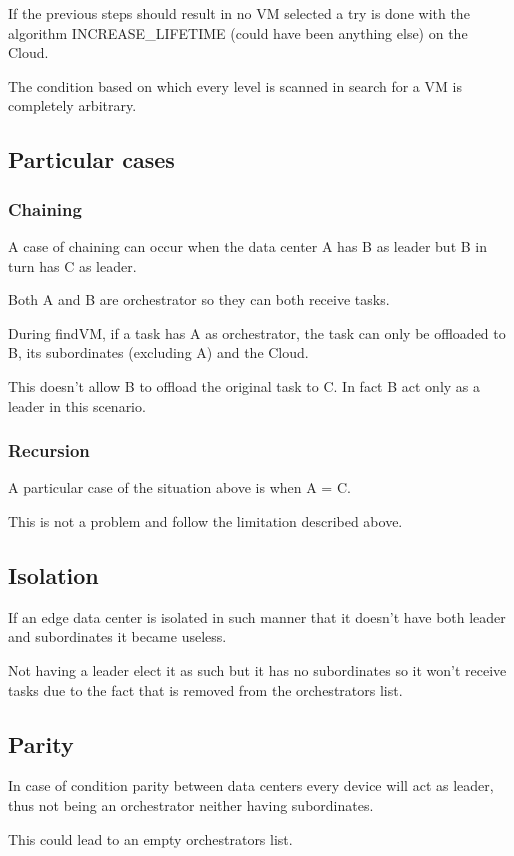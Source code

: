 \documentclass[12pt]{report}
\begin{document}
If the previous steps should result in no VM selected a try is done with the algorithm INCREASE\_LIFETIME (could have been anything else) on the Cloud.

The condition based on which every level is scanned in search for a VM is completely arbitrary.

\subsection*{Particular cases}

\subsubsection*{Chaining}
A case of chaining can occur when the data center A has B as leader but B in turn has C as leader.

Both A and B are orchestrator so they can both receive tasks.

During findVM, if a task has A as orchestrator, the task can only be offloaded to B, its subordinates (excluding A) and the Cloud.

This doesn't allow B to offload the original task to C. In fact B act only as a leader in this scenario.
\subsubsection*{Recursion}
A particular case of the situation above is when A = C.

This is not a problem and follow the limitation described above.


\subsection*{Isolation}
If an edge data center is isolated in such manner that it doesn't have both leader and subordinates it became useless.

Not having a leader elect it as such but it has no subordinates so it won't receive tasks due to the fact that is removed from the orchestrators list.

\subsection*{Parity}
In case of condition parity between data centers every device will act as leader, thus not being an orchestrator neither having subordinates.

This could lead to an empty orchestrators list.
\end{document}

